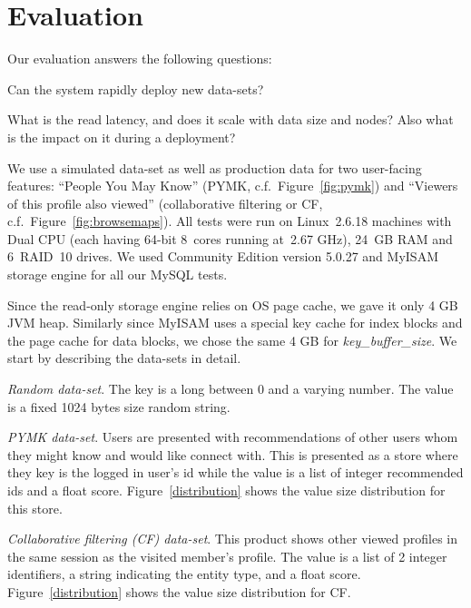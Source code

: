 \section{Evaluation}
\label{sec:evaluation}

Our evaluation answers the following questions:
\begin{compactenum}
\item Can the system rapidly deploy new data-sets? 
\item What is the read latency, and does it scale with data size and nodes? 
Also what is the impact on it during a deployment?
\end{compactenum}

We use a simulated data-set as well as production data for two
user-facing features: ``People You May Know'' (PYMK,
c.f.~Figure~\ref{fig:pymk}) and ``Viewers of this profile also
viewed'' (collaborative filtering or CF,
c.f.~Figure~\ref{fig:browsemaps}). All tests were run on Linux~2.6.18
machines with Dual CPU (each having 64-bit 8~cores running at~2.67 GHz),
24~GB RAM and 6~RAID~10 drives. We used Community Edition
version 5.0.27 and MyISAM storage engine for all our MySQL tests.

Since the read-only storage engine relies on OS page cache, we gave 
it only 4 GB JVM heap. Similarly since MyISAM uses a special key cache
for index blocks and the page cache for data blocks, we chose the same
4 GB for \emph{key\_buffer\_size}. We start by describing the data-sets in detail.

\begin{compactitem}
\item \emph{Random data-set}. The key is a long between
0 and a varying number. The value is a fixed 1024 bytes size random
string. 
\item \emph{PYMK data-set}. Users are presented with recommendations
of other users whom they might know and would like connect with. This
is presented as a store where they key is the logged in user's id
while the value is a list of integer recommended ids and a float
score. Figure~\ref{distribution} shows the value size distribution for
this store. 
\item \emph{Collaborative filtering (CF) data-set}. This product shows
other viewed profiles in the same session as the visited member's
profile. The value is a list of 2 integer identifiers, a string
indicating the entity type, and a float score.
Figure~\ref{distribution} shows the value size distribution for CF. 
\end{compactitem}


